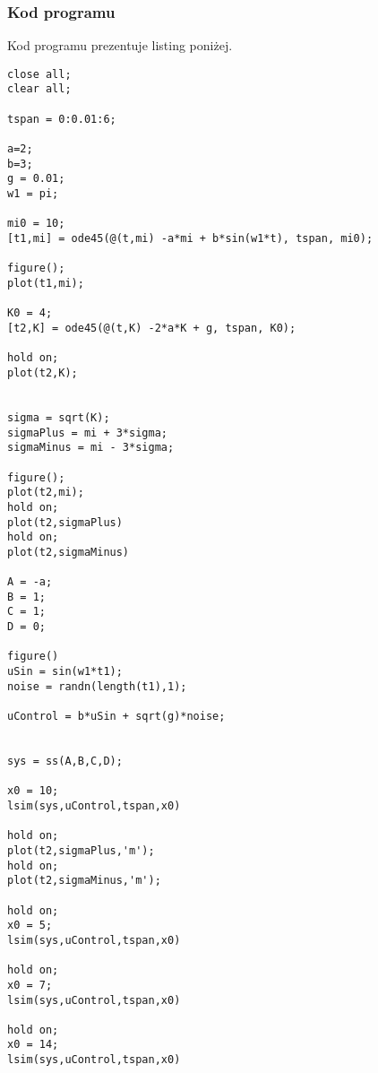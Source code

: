 \documentclass[a4paper,15pt]{article}
\begin{document}
\subsubsection{Kod programu}
Kod programu prezentuje listing poniżej.
\begin{lstlisting}[caption=Zadanie 1, captionpos=b,label=lis1, firstnumber=1,frame=single]
close all;
clear all;

tspan = 0:0.01:6;

a=2;
b=3;
g = 0.01;
w1 = pi;

mi0 = 10;
[t1,mi] = ode45(@(t,mi) -a*mi + b*sin(w1*t), tspan, mi0);

figure();
plot(t1,mi);

K0 = 4;
[t2,K] = ode45(@(t,K) -2*a*K + g, tspan, K0);

hold on;
plot(t2,K);


sigma = sqrt(K);
sigmaPlus = mi + 3*sigma;
sigmaMinus = mi - 3*sigma;

figure();
plot(t2,mi);
hold on;
plot(t2,sigmaPlus)
hold on;
plot(t2,sigmaMinus)

A = -a;
B = 1;
C = 1;
D = 0;

figure()
uSin = sin(w1*t1);
noise = randn(length(t1),1);

uControl = b*uSin + sqrt(g)*noise; 


sys = ss(A,B,C,D);

x0 = 10;
lsim(sys,uControl,tspan,x0) 

hold on;
plot(t2,sigmaPlus,'m');
hold on;
plot(t2,sigmaMinus,'m');

hold on;
x0 = 5;
lsim(sys,uControl,tspan,x0) 

hold on;
x0 = 7;
lsim(sys,uControl,tspan,x0)

hold on;
x0 = 14;
lsim(sys,uControl,tspan,x0) 

\end{lstlisting}
\end{document}
